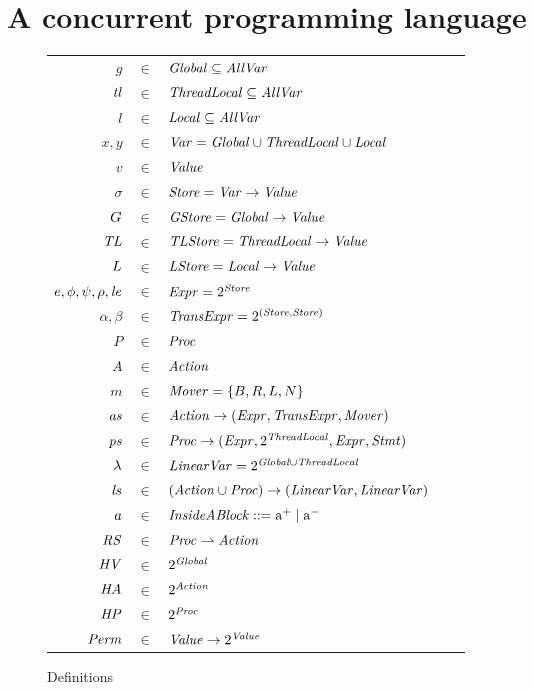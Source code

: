 \section{A concurrent programming language}
\label{sec:language}

\begin{figure}
\setlength{\tabcolsep}{3pt}
\scriptsize{
\begin{tabular}{rclcl}
$g$ & $\in$ & $\mathit{Global} \subseteq \mathit{AllVar}$ \\
$\mathit{tl}$ & $\in$ & $\mathit{ThreadLocal} \subseteq \mathit{AllVar}$ \\
$l$ & $\in$ & $\mathit{Local} \subseteq \mathit{AllVar}$ \\
$x,y$ & $\in$ & $\mathit{Var} = \mathit{Global} \cup \mathit{ThreadLocal} \cup \mathit{Local}$ \\
$v$ &  $\in$ & $\mathit{Value}$ \\
$\sigma$ & $\in$ & $\mathit{Store} = \mathit{Var} \rightarrow \mathit{Value}$ \\
$G$ & $\in$ & $\mathit{GStore} = \mathit{Global} \rightarrow \mathit{Value}$ \\
$\mathit{TL}$ & $\in$ & $\mathit{TLStore} = \mathit{ThreadLocal}  \rightarrow \mathit{Value}$ \\
$L$ & $\in$ & $\mathit{LStore} = \mathit{Local} \rightarrow \mathit{Value}$ \\
$e, \phi, \psi, \rho, \mathit{le}$ & $\in$ & $\mathit{Expr} = 2^{\mathit{Store}}$ \\
$\alpha, \beta$ & $\in$ & $\mathit{TransExpr} = 2^{(\mathit{Store},\mathit{Store})}$ \\
$P$ & $\in$ & $\mathit{Proc}$ \\
$A$ & $\in$ & $\mathit{Action}$ \\
$m$ & $\in$ & $\mathit{Mover} = \{B,R,L,N\}$\\
$\mathit{as}$ & $\in$ & $\mathit{Action} \rightarrow (\mathit{Expr}, \mathit{TransExpr}, \mathit{Mover})$ \\
$\mathit{ps}$ & $\in$ & $\mathit{Proc} \rightarrow (\mathit{Expr}, 2^{\mathit{ThreadLocal}}, \mathit{Expr}, \mathit{Stmt})$ \\
$\lambda$ & $\in$ & $\mathit{LinearVar} = 2^{\mathit{Global} \cup \mathit{ThreadLocal}}$ \\
$\mathit{ls}$ & $\in$ & $(\mathit{Action} \cup \mathit{Proc}) \rightarrow (\mathit{LinearVar}, \mathit{LinearVar})$ \\
$a$ & $\in$ & $\mathit{InsideABlock} ::= \mathrm{a^+} \mid \mathrm{a^-}$ \\
$\mathit{RS}$ & $\in$ & $\mathit{Proc} \rightharpoonup \mathit{Action}$ \\
$\mathit{HV}$ & $\in$ & $2^{\mathit{Global}}$ \\
$\mathit{HA}$ & $\in$ & $2^{\mathit{Action}}$ \\
$\mathit{HP}$ & $\in$ & $2^{\mathit{Proc}}$ \\
$\mathit{Perm}$ & $\in$ & $\mathit{Value} \rightarrow 2^{\mathit{Value}}$
\end{tabular}
}
\caption{Definitions}
\label{fig:definitions}
\end{figure}

